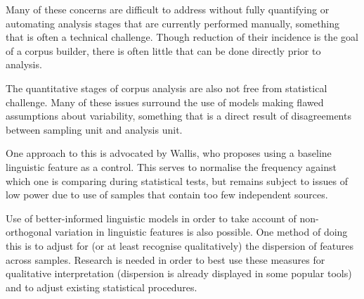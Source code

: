 Many of these concerns are difficult to address without fully quantifying or automating analysis stages that are currently performed manually, something that is often a technical challenge.  Though reduction of their incidence is the goal of a corpus builder, there is often little that can be done directly prior to analysis.

The quantitative stages of corpus analysis are also not free from statistical challenge.  Many of these issues surround the use of models making flawed assumptions about variability\cite{kilgarriff2005language}, something that is a direct result of disagreements between sampling unit and analysis unit.

One approach to this is advocated by Wallis\cite{wallis2013vexed}, who proposes using a baseline linguistic feature as a control.  This serves to normalise the frequency against which one is comparing during statistical tests, but remains subject to issues of low power due to use of samples that contain too few independent sources.

Use of better-informed linguistic models in order to take account of non-orthogonal variation in linguistic features is also possible.  One method of doing this is to adjust for (or at least recognise qualitatively) the dispersion of features across samples\cite{gries2008dispersions,gries2010dispersions}.  Research is needed in order to best use these measures for qualitative interpretation (dispersion is already displayed in some popular tools\cite{anthony2011antconc,rayson2008wmatrix}) and to adjust existing statistical procedures.











